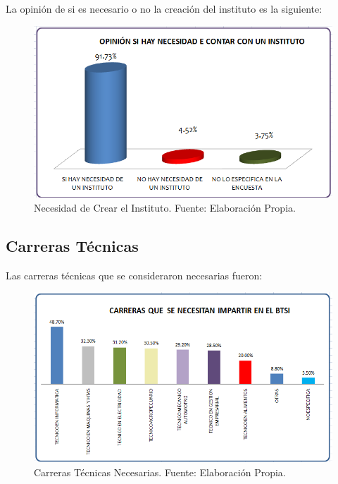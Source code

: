 La opinión de si es necesario o no la creación del instituto es la siguiente:

\begin{figure}[h!]
	\centering
	\includegraphics[scale=0.5]{images/encuesta_necesidad}
	\caption{Necesidad de Crear el Instituto. Fuente: Elaboración Propia.}
	\label{fig:Encuesta:Necesidad}
\end{figure}



\clearpage
\subsection{Carreras Técnicas}

Las carreras técnicas que se consideraron necesarias fueron:

\begin{figure}[h!]
	\centering
	\includegraphics[scale=0.5]{images/encuesta_carreras}
	\caption{Carreras Técnicas Necesarias. Fuente: Elaboración Propia.}
	\label{fig:Encuesta:Carreras}
\end{figure}

